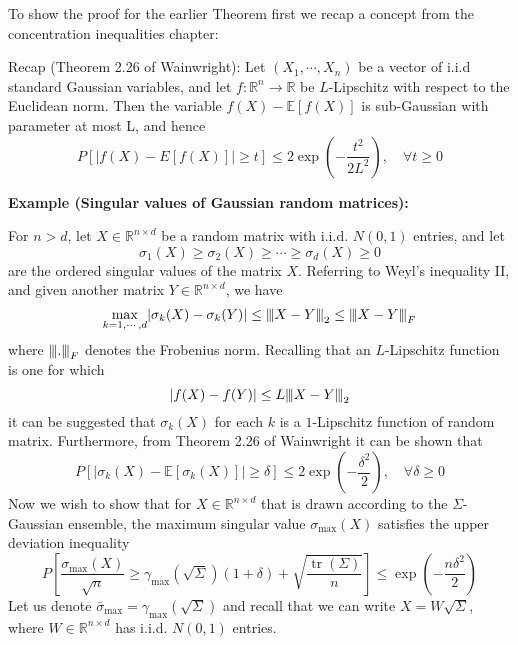 \documentclass[10pt,handout,english]{beamer}
\DeclareMathOperator{\tr}{tr}
\newcommand{\E}{\mathbb{E}}
\newcommand{\R}{\mathbb{R}}
\newcommand{\vertiii}[1]{{\left\vert\kern-0.25ex\left\vert\kern-0.25ex\left\vert #1 
    \right\vert\kern-0.25ex\right\vert\kern-0.25ex\right\vert}}
\begin{document}
\begin{frame}[allowframebreaks]
To show the proof for the earlier Theorem first we recap a concept from the concentration inequalities chapter:
\begin{block}{Recap (Theorem 2.26 of Wainwright):}
Let $(X_1,\cdots,X_n)$ be a vector of i.i.d standard Gaussian variables, and let $f:\R^n\to\R$ be $L$-Lipschitz with respect to the Euclidean norm. Then the variable $f(X)-\E[f(X)]$ is sub-Gaussian with parameter at most L, and hence
 \[
P[\lvert f(X)-E[f(X)]\rvert\geq t]\leq2\exp\left(-\frac{t^2}{2L^2}\right),\quad \forall t\geq 0
\]
\end{block}

\textbf{Example (Singular values of Gaussian random matrices):}

 For $n > d$, let $X\in \R^{n\times d}$ be a random matrix with i.i.d. $N(0,1)$ entries, and let
\[
\sigma_1(X)\geq \sigma_2(X)\geq\cdots\geq\sigma_d(X)\geq 0 
\]
are the ordered singular values of the matrix $X$. Referring to Weyl's inequality II, and given another matrix $Y\in\R^{n\times d}$, we have
\[
\max_{k=1,\cdots,d}\lvert \sigma_k(X)-\sigma_k(Y)\rvert \leq \vertiii{X-Y}_2\leq\vertiii{X-Y}_F
\]
where $\vertiii{.}_F$ denotes the Frobenius norm. Recalling that an $L$-Lipschitz function is one for which
\[
\lvert f(X)-f(Y)\rvert\leq L\vertiii{X-Y}_2
\]
it can be suggested that $\sigma_k(X)$ for each $k$ is a $1$-Lipschitz function of random matrix.  Furthermore, from Theorem 2.26 of Wainwright it can be shown that
\[
P[\lvert\sigma_k(X)-\E[\sigma_k(X)]\rvert\geq \delta ]\leq2\exp\left(-\frac{\delta^2}{2}\right),\quad\forall \delta\geq 0
\]
Now we wish to show that for $X\in\R^{n\times d}$ that is drawn according to the $\Sigma$-Gaussian ensemble, the maximum singular value $\sigma_{\max}(X)$ satisfies the upper deviation inequality
 \[
P\left[\frac{\sigma_{\max}(X)}{\sqrt{n}}\geq\gamma_{\max}(\sqrt{\Sigma})(1+\delta)+\sqrt{\frac{\tr(\Sigma)}{n}}\right]\leq \exp\left(-\frac{n\delta^2}{2}\right)
\]
Let us denote $\bar{\sigma}_{\max}=\gamma_{\max}(\sqrt{\Sigma})$ and recall that we can write $X=W\sqrt{\Sigma}$, where $W\in\R^{n\times d}$ has i.i.d. $N(0,1)$ entries. 


\end{frame}
\end{document}
